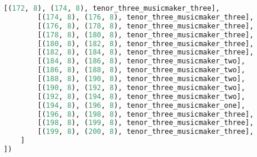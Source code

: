 \begin{lstlisting}[language=Python, caption=Invocation Source Code]
        [(172, 8), (174, 8), tenor_three_musicmaker_three],
        [(174, 8), (176, 8), tenor_three_musicmaker_three],
        [(176, 8), (178, 8), tenor_three_musicmaker_three],
        [(178, 8), (180, 8), tenor_three_musicmaker_three],
        [(180, 8), (182, 8), tenor_three_musicmaker_three],
        [(182, 8), (184, 8), tenor_three_musicmaker_three],
        [(184, 8), (186, 8), tenor_three_musicmaker_two],
        [(186, 8), (188, 8), tenor_three_musicmaker_two],
        [(188, 8), (190, 8), tenor_three_musicmaker_two],
        [(190, 8), (192, 8), tenor_three_musicmaker_two],
        [(192, 8), (194, 8), tenor_three_musicmaker_two],
        [(194, 8), (196, 8), tenor_three_musicmaker_one],
        [(196, 8), (198, 8), tenor_three_musicmaker_three],
        [(198, 8), (199, 8), tenor_three_musicmaker_three],
        [(199, 8), (200, 8), tenor_three_musicmaker_three],
    ]
])


\end{lstlisting}
